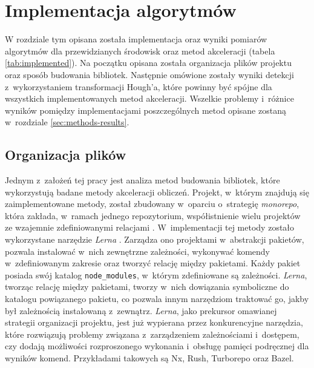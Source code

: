 \chapter{Implementacja algorytmów}
\label{sec:implementation}

W rozdziale tym opisana została implementacja oraz wyniki pomiarów algorytmów dla przewidzianych środowisk oraz metod akceleracji (tabela \ref{tab:implemented}). Na początku opisana została organizacja plików projektu oraz sposób budowania bibliotek. Następnie omówione zostały wyniki detekcji z~wykorzystaniem transformacji Hough'a, które powinny być spójne dla wszystkich implementowanych metod akceleracji. Wszelkie problemy i~różnice wyników pomiędzy implementacjami poszczególnych metod opisane zostaną w~rozdziale \ref{sec:methods-results}. 



\section{Organizacja plików}

Jednym z~założeń tej pracy jest analiza metod budowania bibliotek, które wykorzystują badane metody akceleracji obliczeń. Projekt, w~którym znajdują się zaimplementowane metody, został zbudowany w~oparciu o~strategię \textit{monorepo}, która zakłada, w~ramach jednego repozytorium, współistnienie wielu projektów ze wzajemnie zdefiniowanymi relacjami \cite{monorepo}. W~implementacji tej metody zostało wykorzystane narzędzie \textit{Lerna} \cite{lerna}. Zarządza ono projektami w~abstrakcji pakietów, pozwala instalować w~nich zewnętrzne zależności, wykonywać komendy w~zdefiniowanym zakresie oraz tworzyć relację między pakietami. Każdy pakiet posiada swój katalog \lstinline{node_modules}, w~którym zdefiniowane są zależności. \textit{Lerna}, tworząc relację między pakietami, tworzy w~nich dowiązania symboliczne do katalogu powiązanego pakietu, co pozwala innym narzędziom traktować go, jakby był zależnością instalowaną z~zewnątrz. \textit{Lerna}, jako prekursor omawianej strategii organizacji projektu, jest już wypierana przez konkurencyjne narzędzia, które rozwiązują problemy związana z~zarządzeniem zależnościami i~dostępem, czy dodają możliwości rozproszonego wykonania i~obsługę pamięci podręcznej dla wyników komend. Przykładami takowych są Nx, Rush, Turborepo oraz Bazel.

